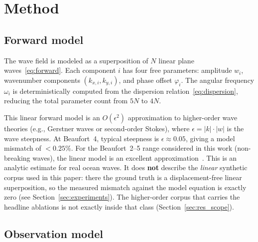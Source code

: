 \documentclass[review]{elsarticle}
\begin{document}
\section{Method}
\label{sec:method}

\subsection{Forward model}

The wave field is modeled as a superposition of $N$ linear plane
waves~\eqref{eq:forward}.
Each component $i$ has four free parameters: amplitude $w_i$,
wavenumber components $(k_{x,i}, k_{y,i})$, and phase offset
$\varphi_i$. The angular frequency $\omega_i$ is deterministically
computed from the dispersion relation~\eqref{eq:dispersion},
reducing the total parameter count from $5N$ to $4N$.

This linear forward model is an $O(\epsilon^2)$ approximation to
higher-order wave theories (e.g., Gerstner waves or second-order
Stokes), where $\epsilon = |k| \cdot |w|$ is the wave steepness.
At Beaufort~4, typical steepness is $\epsilon \approx 0.05$,
giving a model mismatch of $< 0.25\%$.
For the Beaufort~2--5 range considered in this work
(non-breaking waves), the linear model is an excellent
approximation~\citep{holthuijsen2007}.
This is an analytic estimate for real ocean waves.
It does \textbf{not} describe the \emph{linear} synthetic corpus used in this paper:
there the ground truth is a displacement-free linear superposition, so the measured
mismatch against the model equation is exactly zero (see
Section~\ref{sec:experiments}). The higher-order corpus that carries the headline
ablations is not exactly inside that class (Section~\ref{sec:res_scope}).

\subsection{Observation model}
\label{sec:obsmodel}
\end{document}
